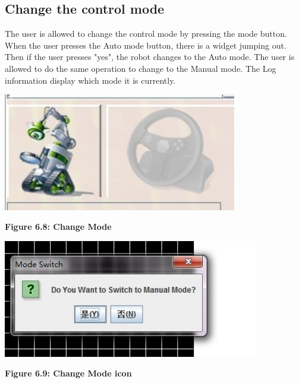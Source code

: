 \documentclass[11pt, a4paper]{report}
\begin{document}
\subsection{Change the control mode}
The user is allowed to change the control mode by pressing the mode button. When the user presses the Auto mode button, there is a widget jumping out. Then if the user presses "yes", the robot changes to the Auto mode. The user is allowed to do the same operation to change to the Manual mode.  The Log information display which mode it is currently.
\begin{center}
 \includegraphics[width=10.20cm]{ControlModeAuto.jpg}
\end{center}
\begin{center}
\textbf {Figure 6.8: Change Mode} \\[0.3cm]
\end{center}
\begin{center}
 \includegraphics[width=11.20cm]{ModeSwitch.jpg}
\end{center}
\begin{center}
\textbf {Figure 6.9: Change Mode icon} \\[0.3cm]
\end{center}
\end{document}
